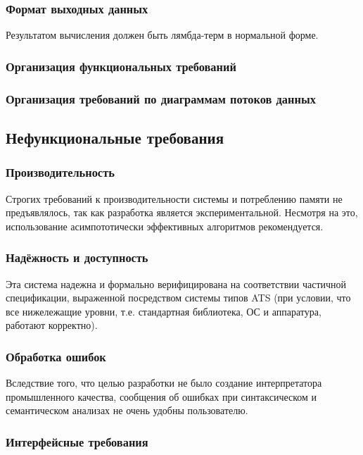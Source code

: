 \subsubsection{Формат выходных данных}

Результатом вычисления должен быть лямбда-терм в нормальной форме.

\subsubsection{Организация функциональных требований}
\subsubsection{Организация требований по диаграммам потоков данных}

\subsection{Нефункциональные требования}
\subsubsection{Производительность}

Строгих требований к производительности системы и потреблению памяти не предъявлялось, так как разработка является экспериментальной. Несмотря на это, использование асимпототически эффективных алгоритмов рекомендуется.

\subsubsection{Надёжность и доступность}

Эта система надежна и формально верифицирована на соответствии частичной спецификации, выраженной посредством системы типов ATS (при условии, что все нижележащие уровни, т.е. стандартная библиотека, ОС и аппаратура, работают корректно).

\subsubsection{Обработка ошибок}

Вследствие того, что целью разработки не было создание интерпретатора промышленного качества, сообщения об ошибках при синтаксическом и семантическом анализах не очень удобны пользователю.

\subsubsection{Интерфейсные требования}

